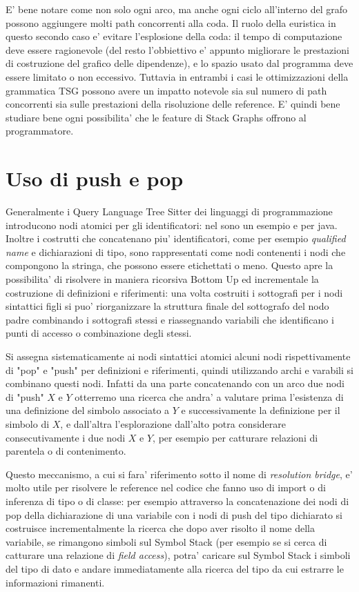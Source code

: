 \par
E' bene notare come non solo ogni arco, ma anche ogni ciclo all'interno del grafo possono aggiungere molti path concorrenti alla coda.
Il ruolo della euristica in questo secondo caso e' evitare l'esplosione della coda: il tempo di computazione deve essere ragionevole (del resto l'obbiettivo e' appunto migliorare le prestazioni di costruzione del grafico delle dipendenze), e lo spazio usato dal programma deve essere limitato o non eccessivo.
Tuttavia in entrambi i casi le ottimizzazioni della grammatica TSG possono avere un impatto notevole sia sul numero di path concorrenti sia sulle prestazioni della risoluzione delle reference. E' quindi bene studiare bene ogni possibilita' che le feature di Stack Graphs offrono al programmatore.

\section{Uso di push e pop}

Generalmente i Query Language Tree Sitter dei linguaggi di programmazione introducono nodi atomici per gli identificatori: nel sono un esempio \emph{} e \emph{} per java.
Inoltre i costrutti che concatenano piu' identificatori, come per esempio \emph{qualified name} e dichiarazioni di tipo, sono rappresentati come nodi contenenti i nodi che compongono la stringa, che possono essere etichettati o meno.
Questo apre la possibilita' di risolvere in maniera ricorsiva Bottom Up ed incrementale la costruzione di definizioni e riferimenti: una volta costruiti i sottografi per i nodi sintattici figli si puo' riorganizzare la struttura finale del sottografo del nodo padre combinando i sottografi stessi e riassegnando variabili che identificano i punti di accesso o combinazione degli stessi.

\par
Si assegna sistematicamente ai nodi sintattici atomici alcuni nodi rispettivamente di "pop" e "push" per definizioni e riferimenti, quindi utilizzando archi e varabili si combinano questi nodi.
Infatti da una parte concatenando con un arco due nodi di "push" $X$ e $Y$ otterremo una ricerca che andra' a valutare prima l'esistenza di una definizione del simbolo associato a $Y$ e successivamente la definizione per il simbolo di $X$, e dall'altra l'esplorazione dall'alto potra considerare consecutivamente i due nodi $X$ e $Y$, per esempio per catturare relazioni di parentela o di contenimento.

\par
Questo meccanismo, a cui si fara' riferimento sotto il nome di \emph{resolution bridge}, e' molto utile per risolvere le reference nel codice che fanno uso di import o di inferenza di tipo o di classe: per esempio attraverso la concatenazione dei nodi di pop della dichiarazione di una variabile con i nodi di push del tipo dichiarato si costruisce incrementalmente la ricerca che dopo aver risolto il nome della variabile, se rimangono simboli sul Symbol Stack (per esempio se si cerca di catturare una relazione di \emph{field access}), potra' caricare sul Symbol Stack i simboli del tipo di dato e andare immediatamente alla ricerca del tipo da cui estrarre le informazioni rimanenti.

